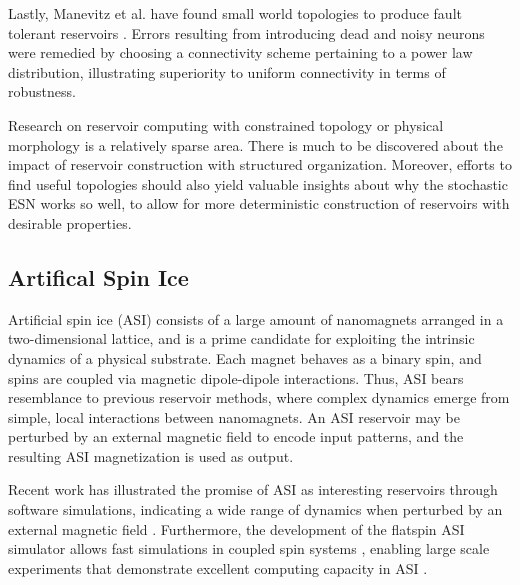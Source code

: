 Lastly, Manevitz et al. have found small world topologies to produce fault
tolerant reservoirs \cite{sidorov_stability_2010}. Errors resulting from
introducing dead and noisy neurons were remedied by choosing a connectivity
scheme pertaining to a power law distribution, illustrating superiority to
uniform connectivity in terms of robustness.

Research on reservoir computing with constrained topology or physical morphology
is a relatively sparse area. There is much to be discovered about the impact of
reservoir construction with structured organization. Moreover, efforts to find
useful topologies should also yield valuable insights about why the stochastic
ESN works so well, to allow for more deterministic construction of reservoirs
with desirable properties.

\subsection{Artifical Spin Ice}
\label{ssec:asi}

Artificial spin ice (ASI) consists of a large amount of nanomagnets arranged in
a two-dimensional lattice, and is a prime candidate for exploiting the intrinsic
dynamics of a physical substrate. Each magnet behaves as a binary spin, and
spins are coupled via magnetic dipole-dipole interactions. Thus, ASI bears
resemblance to previous reservoir methods, where complex dynamics emerge from
simple, local interactions between nanomagnets. An ASI reservoir may be
perturbed by an external magnetic field to encode input patterns, and the
resulting ASI magnetization is used as output.

Recent work has illustrated the promise of ASI as interesting reservoirs through
software simulations, indicating a wide range of dynamics when perturbed by an
external magnetic field \cite{jensen_computation_2018}. Furthermore, the
development of the flatspin ASI simulator allows fast simulations in coupled
spin systems \cite{jensen_flatspin_2020}, enabling large scale experiments that
demonstrate excellent computing capacity in ASI \cite{jensen_reservoir_2020}.

